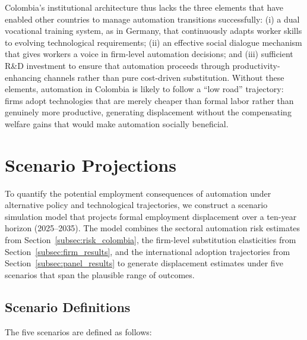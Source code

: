\documentclass{article}
\begin{document}
Colombia's institutional architecture thus lacks the three elements that have enabled other countries to manage automation transitions successfully: (i) a dual vocational training system, as in Germany, that continuously adapts worker skills to evolving technological requirements; (ii) an effective social dialogue mechanism that gives workers a voice in firm-level automation decisions; and (iii) sufficient R\&D investment to ensure that automation proceeds through productivity-enhancing channels rather than pure cost-driven substitution. Without these elements, automation in Colombia is likely to follow a ``low road'' trajectory: firms adopt technologies that are merely cheaper than formal labor rather than genuinely more productive, generating displacement without the compensating welfare gains that would make automation socially beneficial.


\section{Scenario Projections}
\label{sec:scenarios}

To quantify the potential employment consequences of automation under alternative policy and technological trajectories, we construct a scenario simulation model that projects formal employment displacement over a ten-year horizon (2025--2035). The model combines the sectoral automation risk estimates from Section~\ref{subsec:risk_colombia}, the firm-level substitution elasticities from Section~\ref{subsec:firm_results}, and the international adoption trajectories from Section~\ref{subsec:panel_results} to generate displacement estimates under five scenarios that span the plausible range of outcomes.

\subsection{Scenario Definitions}
\label{subsec:scenario_definitions}

The five scenarios are defined as follows:
\end{document}
